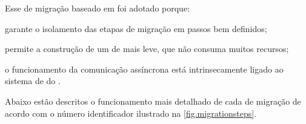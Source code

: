 Esse \design de migração baseado em \tasks foi adotado porque:
\begin{inlinelist}
    \item garante o isolamento das etapas de migração em passos bem definidos;
    \item permite a construção de um \design de \daemon mais leve, que não consuma muitos recursos;
    \item o funcionamento da comunicação assíncrona está intrinsecamente ligado ao sistema de \tasks do \nanvix. 
\end{inlinelist}



Abaixo estão descritos o funcionamento mais detalhado de cada \task de migração de acordo com o número identificador ilustrado na \autoref{fig.migrationsteps}.


